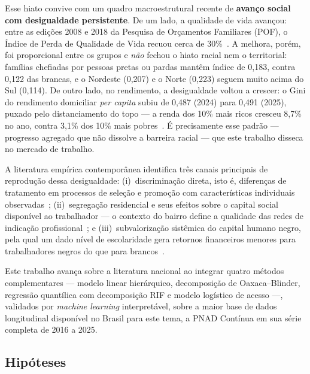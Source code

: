 \documentclass[12pt, a4paper, oneside]{article}
\let\oldsubsectionFB\subsection
\renewcommand{\subsection}{\FloatBarrier\oldsubsectionFB}
\begin{document}
Esse hiato convive com um quadro macroestrutural recente de \textbf{avanço social
com desigualdade persistente}. De um lado, a qualidade de vida avançou: entre as
edições 2008 e 2018 da Pesquisa de Orçamentos Familiares (POF), o Índice de Perda
de Qualidade de Vida recuou cerca de 30\%~\cite{ibge_pof_2019}. A melhora, porém,
foi proporcional entre os grupos e \emph{não} fechou o hiato racial nem o
territorial: famílias chefiadas por pessoas pretas ou pardas mantêm índice de
0{,}183, contra 0{,}122 das brancas, e o Nordeste (0{,}207) e o Norte
(0{,}223) seguem muito acima do Sul (0{,}114). De outro lado, no rendimento, a
desigualdade voltou a crescer: o Gini do rendimento domiciliar \emph{per capita}
subiu de 0{,}487 (2024) para 0{,}491 (2025), puxado pelo distanciamento do topo
--- a renda dos 10\% mais ricos cresceu 8{,}7\% no ano, contra 3{,}1\% dos 10\%
mais pobres~\cite{ibge_rendimentos_2025}. É precisamente esse padrão --- progresso
agregado que não dissolve a barreira racial --- que este trabalho disseca no
mercado de trabalho.

A literatura empírica contemporânea identifica três canais principais de
reprodução dessa desigualdade: (i)~discriminação direta, isto é, diferenças
de tratamento em processos de seleção e promoção com características
individuais observadas~\cite{pager2007}; (ii)~segregação residencial e
seus efeitos sobre o capital social disponível ao trabalhador
--- o contexto do bairro define a qualidade das redes de indicação
profissional~\cite{wilson1987, sampson1997}; e (iii)~subvalorização
sistêmica do capital humano negro, pela qual um dado nível de escolaridade
gera retornos financeiros menores para trabalhadores negros do que para
brancos~\cite{hasenbalg1979, pager2007}.

Este trabalho avança sobre a literatura nacional ao integrar quatro métodos
complementares --- modelo linear hierárquico, decomposição de Oaxaca--Blinder,
regressão quantílica com decomposição RIF e modelo logístico de acesso ---,
validados por \textit{machine learning} interpretável, sobre a maior base de dados
longitudinal disponível no Brasil para este tema, a PNAD Contínua em sua
série completa de 2016 a 2025.

\subsection{Hipóteses}
\label{subsec:hipoteses}
\end{document}
